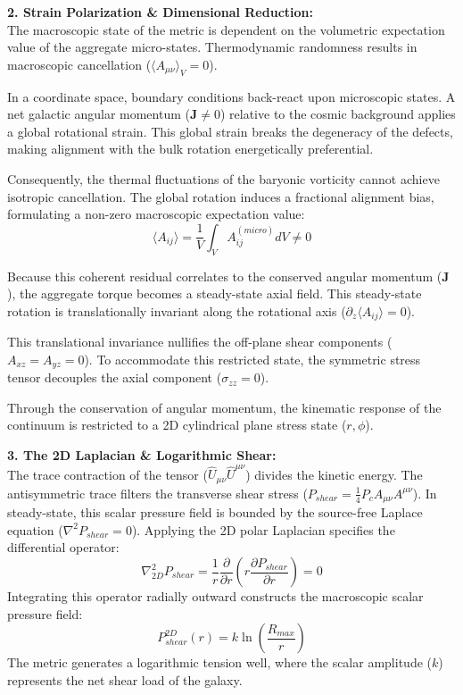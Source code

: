 
\textbf{2. Strain Polarization \& Dimensional Reduction:} \\ 
The macroscopic state of the metric is dependent on the volumetric expectation value of the aggregate micro-states. Thermodynamic randomness results in macroscopic cancellation ($\langle A_{\mu\nu} \rangle_V = 0$). 

In a coordinate space, boundary conditions back-react upon microscopic states. A net galactic angular momentum ($\mathbf{J} \neq 0$) relative to the cosmic background applies a global rotational strain. This global strain breaks the degeneracy of the defects, making alignment with the bulk rotation energetically preferential. 

Consequently, the thermal fluctuations of the baryonic vorticity cannot achieve isotropic cancellation. The global rotation induces a fractional alignment bias, formulating a non-zero macroscopic expectation value: 
\begin{equation}
    \langle A_{ij} \rangle = \frac{1}{V} \int_V A_{ij}^{(micro)} dV \neq 0
\end{equation}

Because this coherent residual correlates to the conserved angular momentum ($\mathbf{J}$), the aggregate torque becomes a steady-state axial field. This steady-state rotation is translationally invariant along the rotational axis ($\partial_z \langle A_{ij} \rangle = 0$). 

This translational invariance nullifies the off-plane shear components ($A_{xz} = A_{yz} = 0$).  To accommodate this restricted state, the symmetric stress tensor decouples the axial component ($\sigma_{zz} = 0$). 

Through the conservation of angular momentum, the kinematic response of the continuum is restricted to a 2D cylindrical plane stress state ($r, \phi$). 

\textbf{3. The 2D Laplacian \& Logarithmic Shear:} \\
The trace contraction of the tensor ($\hat{U}_{\mu\nu}\hat{U}^{\mu\nu}$) divides the kinetic energy. The antisymmetric trace filters the transverse shear stress ($P_{shear} = \frac{1}{4} P_c A_{\mu\nu}A^{\mu\nu}$). In steady-state, this scalar pressure field is bounded by the source-free Laplace equation ($\nabla^2 P_{shear} = 0$). 
Applying the 2D polar Laplacian specifies the differential operator: 
\begin{equation}
    \nabla_{2D}^2 P_{shear} = \frac{1}{r} \frac{\partial}{\partial r} \left( r \frac{\partial P_{shear}}{\partial r} \right) = 0
\end{equation}
Integrating this operator radially outward constructs the macroscopic scalar pressure field:
\begin{equation}
    P_{shear}^{2D}(r) = k \ln \left( \frac{R_{max}}{r} \right) \label{eq:logarithmic_shear_pressure}
\end{equation}
The metric generates a logarithmic tension well, where the scalar amplitude ($k$) represents the net shear load of the galaxy. 

